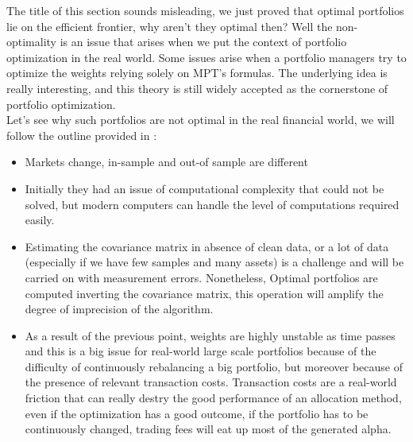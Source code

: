 The title of this section sounds misleading, we just proved that optimal portfolios lie on the efficient frontier, why aren't they optimal then? Well the non-optimality is an issue that arises when we put the context of portfolio optimization in the real world. Some issues arise when a portfolio managers try to optimize the weights relying solely on MPT's formulas. The underlying idea is really interesting, and this theory is still widely accepted as the cornerstone of portfolio optimization.\\
Let's see why such portfolios are not optimal in the real financial world, we will follow the outline provided in \cite{Critica_Markowitz}:

\begin{itemize}
	\item Markets change, in-sample and out-of sample are different
	\item Initially they had an issue of computational complexity that could not be solved, but modern computers can handle the level of computations required easily.
	\item Estimating the covariance matrix in absence of clean data, or a lot of data (especially if we have few samples and many assets) is a challenge and will be carried on with measurement errors. Nonetheless, Optimal portfolios are computed inverting the covariance matrix, this operation will amplify the degree of imprecision of the algorithm.
	\item As a result of the previous point, weights are highly unstable as time passes and this is a big issue for real-world large scale portfolios because of the difficulty of continuously rebalancing a big portfolio, but moreover because of the presence of relevant transaction costs. Transaction costs are a real-world friction that can really destry the good performance of an allocation method, even if the optimization has a good outcome, if the portfolio has to be continuously changed, trading fees will eat up most of the generated alpha.
\end{itemize}